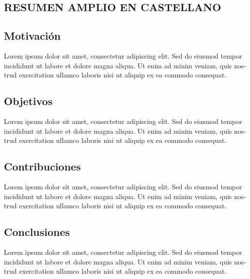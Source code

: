 



\begin{otherlanguage}{spanish}
\chapter*{RESUMEN AMPLIO EN CASTELLANO}

\section*{Motivación}
Lorem ipsum dolor sit amet, consectetur adipiscing elit. Sed do eiusmod tempor incididunt ut labore et dolore magna aliqua. Ut enim ad minim veniam, quis nostrud exercitation ullamco laboris nisi ut aliquip ex ea commodo consequat.


\section*{Objetivos}

Lorem ipsum dolor sit amet, consectetur adipiscing elit. Sed do eiusmod tempor incididunt ut labore et dolore magna aliqua. Ut enim ad minim veniam, quis nostrud exercitation ullamco laboris nisi ut aliquip ex ea commodo consequat.


\section*{Contribuciones}
Lorem ipsum dolor sit amet, consectetur adipiscing elit. Sed do eiusmod tempor incididunt ut labore et dolore magna aliqua. Ut enim ad minim veniam, quis nostrud exercitation ullamco laboris nisi ut aliquip ex ea commodo consequat.


\section*{Conclusiones}
Lorem ipsum dolor sit amet, consectetur adipiscing elit. Sed do eiusmod tempor incididunt ut labore et dolore magna aliqua. Ut enim ad minim veniam, quis nostrud exercitation ullamco laboris nisi ut aliquip ex ea commodo consequat.


\end{otherlanguage}

		

